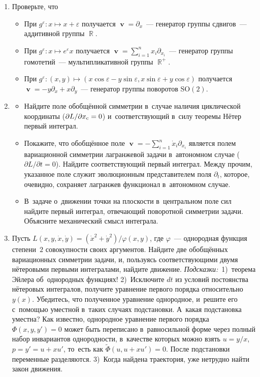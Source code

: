 \documentclass[a4paper,11pt]{article}
\newcommand\slashfrac[2]{{#1/#2}}
\theoremstyle{definition}
\begin{document}
\begin{enumerate}

\item
Проверьте, что
\begin{itemize}
\item
При $g^\varepsilon\colon x\mapsto x+\varepsilon$ получается
$\mbfv=\partial_x$~— генератор группы сдвигов~— аддитивной группы $\BbbR$.

\item
При $g^\varepsilon\colon x\mapsto e^\varepsilon x$
получается $\mbfv=\sum_{i=1}^nx_i\partial_{x_i}$~— генератор группы гомотетий~—
мультипликативной группы $\BbbR^+$.

\item
При
$g^\varepsilon\colon(x,y)\mapsto(x\cos\varepsilon-y\sin\varepsilon,x\sin\varepsilon+y\cos\varepsilon)$
получается $\mbfv=-y\partial_x+x\partial_y$~— генератор группы поворотов
$\mathup{SO}(2)$.
\end{itemize}

\item\label{prb:jacobi}
\begin{itemize}
\item
Найдите поле обобщённой симметрии в~случае наличия циклической координаты
($\slashfrac{\partial L}{\partial x_{\text c}}=0$) и~соответствующий в~силу
теоремы Нётер первый интеграл.
\item
Покажите, что обобщённое поле $\mbfv=-\sum_{i=1}^n\dot x_i\partial_{x_i}$
является полем вариационной симметрии лагранжевой задачи в~автономном случае
($\slashfrac{\partial L}{\partial t}=0$). Найдите соответствующий первый
интеграл. Между прочим, указанное поле служит эволюционным представителем поля
$\partial_t$, которое, очевидно, сохраняет лагранжев функционал в~автономном
случае.
\item
В~задаче о~движении точки на плоскости в~центральном поле сил найдите первый
интеграл, отвечающий поворотной симметрии задачи. Объясните механический смысл
интеграла.
\end{itemize}

\item
Пусть $L(x,y,\dot x,\dot y)=\slashfrac{(\dot x^2+\dot y^2)}{\varphi(x,y)}$, где
$\varphi$~— однородная функция степени~$2$ совокупности своих аргументов.
Найдите две обобщённых вариационных симметрии задачи, и, пользуясь
соответствующими двумя нётеровыми первыми интегралами, найдите движение.
\emph{Подсказки:\/}~1)~теорема Эйлера об~однородных функциях! 2)~Исключите $dt$
из условий постоянства нётеровых интегралов, получите уравнение первого порядка
относительно~$y(x)$. Убедитесь, что полученное уравнение однородное, и~решите
его с~помощью уместной в~таких случаях подстановки. А~какая подстановка
уместна? Как известно, однородное уравнение первого порядка $\Phi(x,y,y')=0$
может быть переписано в~равносильной форме через полный набор инвариантов
однородности, в~качестве которых можно взять $u=\slashfrac yx$, $p=y'=u+xu'$,
то~есть как $\tilde\Phi(u,u+xu')=0$. После подстановки переменные разделяются.
3)~Когда найдена траектория, уже нетрудно найти закон движения.


\end{enumerate}
\end{document}
